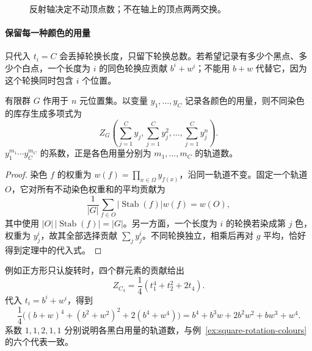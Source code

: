 \documentclass[lang=cn,a4paper,fontset=none,zihao=false,10pt,openany,twoside]{beautybook}
\numberwithin{algorithm}{chapter}
\begin{document}
\begin{figure}[H]
\centering
{}
\caption{反射轴决定不动顶点数；不在轴上的顶点两两交换。}
\end{figure}

\paragraph{保留每一种颜色的用量}
只代入 $t_i=C$ 会丢掉轮换长度，只留下轮换总数。若希望记录有多少个黑点、多少个白点，一个长度为 $i$ 的同色轮换应贡献 $b^i+w^i$；不能用 $b+w$ 代替它，因为这个轮换同时包含 $i$ 个位置。
\begin{theorem}\label{thm:polya-counting}
有限群 $G$ 作用于 $n$ 元位置集。以变量 $y_1,\ldots,y_C$ 记录各颜色的用量，则不同染色的库存生成多项式为
\[
 Z_G\left(\sum_{j=1}^Cy_j,\sum_{j=1}^Cy_j^2,\ldots,\sum_{j=1}^Cy_j^n\right).
\]
$y_1^{m_1}\cdots y_C^{m_C}$ 的系数，正是各色用量分别为 $m_1,\ldots,m_C$ 的轨道数。
\end{theorem}
\begin{proof}
染色 $f$ 的权重为 $w(f)=\prod_{x\in\Omega}y_{f(x)}$，沿同一轨道不变。固定一个轨道 $O$，它对所有不动染色权重和的平均贡献为
\[
 \frac1{|G|}\sum_{f\in O}|\operatorname{Stab}(f)|w(f)=w(O),
\]
其中使用 $|O|\,|\operatorname{Stab}(f)|=|G|$。另一方面，一个长度为 $i$ 的轮换若染成第 $j$ 色，权重为 $y_j^i$，故其全部选择贡献 $\sum_j y_j^i$。不同轮换独立，相乘后再对 $g$ 平均，恰好得到定理中的代入式。
\end{proof}

例如正方形只认旋转时，四个群元素的贡献给出
\[
 Z_{C_4}=\frac14(t_1^4+t_2^2+2t_4).
\]
代入 $t_i=b^i+w^i$，得到
\[
 \frac14\bigl((b+w)^4+(b^2+w^2)^2+2(b^4+w^4)\bigr)
 =b^4+b^3w+2b^2w^2+bw^3+w^4.
\]
系数 $1,1,2,1,1$ 分别说明各黑白用量的轨道数，与例~\ref{ex:square-rotation-colours} 的六个代表一致。
\end{document}
